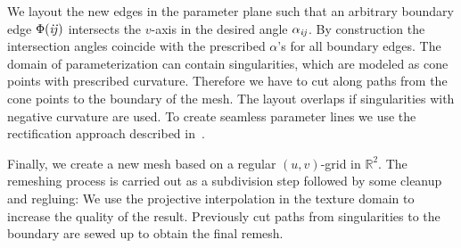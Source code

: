 \documentclass[twoside]{article}
\begin{document}
We layout the new edges in the parameter plane such that an arbitrary 
boundary edge $\Phi(\mathrm{\it{ij}})$ intersects the $v$-axis in the desired angle 
$\alpha_{\mathrm{\it{ij}}}$. By construction
the intersection angles coincide with the prescribed $\alpha$'s for all
boundary edges. 
The domain of parameterization can contain singularities, which are
modeled as cone points with prescribed curvature. Therefore we have to 
cut along paths from the cone points to the boundary of the mesh. 
The layout overlaps if singularities with negative curvature are used. 
To create seamless parameter lines we use the rectification approach 
described in~\cite{Springborn:2008:CET}.

Finally, we create a new mesh based on a regular $(u,v)$-grid in $\mathbb R^2$. 
The remeshing process is carried out as a subdivision step followed by some cleanup
and regluing: We use the projective interpolation in the texture domain to 
increase the quality of the result. Previously cut paths from singularities to the 
boundary are sewed up to obtain the final remesh.

\end{document}
